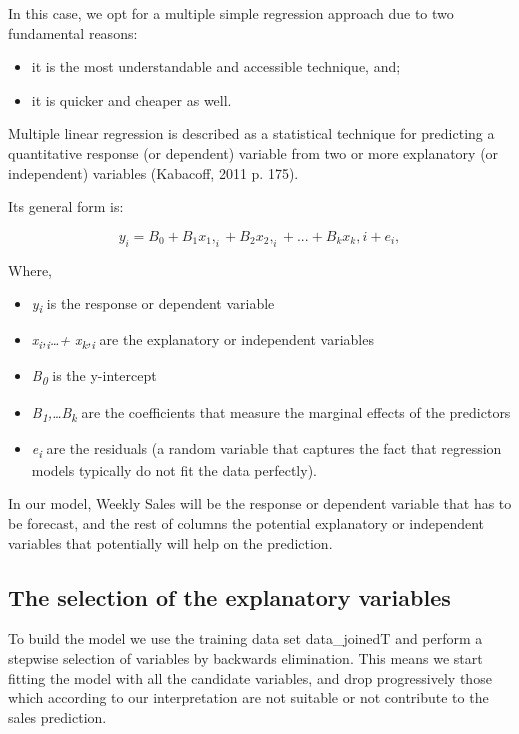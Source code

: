 \documentclass[11pt,]{article}
\providecommand{\tightlist}{%
  \setlength{\itemsep}{0pt}\setlength{\parskip}{0pt}}
\begin{document}
In this case, we opt for a multiple simple regression approach due to
two fundamental reasons:

\begin{itemize}
\item
  it is the most understandable and accessible technique, and;
\item
  it is quicker and cheaper as well.
\end{itemize}

Multiple linear regression is described as a statistical technique for
predicting a quantitative response (or dependent) variable from two or
more explanatory (or independent) variables (Kabacoff, 2011 p. 175).

Its general form is:

\[{y_i} = {B}_0 + {B}_1{x}_1,_i + {B}_2{x}_2,_i+...+ {B}_k{x}_k,i + {e}_i,\]

Where,

\begin{itemize}
\tightlist
\item
  \emph{y\textsubscript{i}} is the response or dependent variable
\item
  \emph{x\textsubscript{i},\textsubscript{i}\ldots{}+
  x\textsubscript{k},\textsubscript{i}} are the explanatory or
  independent variables
\item
  \emph{B\textsubscript{0}} is the y-intercept
\item
  \emph{B\textsubscript{1},\ldots{}B\textsubscript{k}} are the
  coefficients that measure the marginal effects of the predictors
\item
  \emph{e\textsubscript{i}} are the residuals (a random variable that
  captures the fact that regression models typically do not fit the data
  perfectly).
\end{itemize}

In our model, Weekly Sales will be the response or dependent variable
that has to be forecast, and the rest of columns the potential
explanatory or independent variables that potentially will help on the
prediction.

\subsection{The selection of the explanatory
variables}\label{the-selection-of-the-explanatory-variables}

To build the model we use the training data set data\_joinedT and
perform a stepwise selection of variables by backwards elimination. This
means we start fitting the model with all the candidate variables, and
drop progressively those which according to our interpretation are not
suitable or not contribute to the sales prediction.
\end{document}
